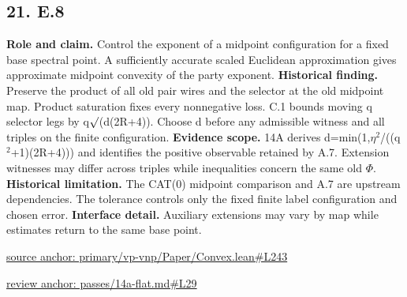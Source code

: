\documentclass[11pt,letterpaper]{article}
\theoremstyle{definition}\newtheorem{definition}[theorem]{Definition}\newtheorem{example}[theorem]{Example}
\theoremstyle{remark}\newtheorem{remark}[theorem]{Remark}
\begin{document}
\subsection*{21. E.8}
\textbf{Role and claim.} Control the exponent of a midpoint configuration for a fixed base spectral point. A sufficiently accurate scaled Euclidean approximation gives approximate midpoint convexity of the party exponent.
\textbf{Historical finding.} Preserve the product of all old pair wires and the selector at the old midpoint map. Product saturation fixes every nonnegative loss. C.1 bounds moving q selector legs by q\ensuremath{\sqrt{\vphantom{x}}}(d(2R+4)). Choose d before any admissible witness and all triples on the finite configuration.
\textbf{Evidence scope.} 14A derives d=min(1,\ensuremath{\eta}\ensuremath{{}^2}/((q\ensuremath{{}^2}+1)(2R+4))) and identifies the positive observable retained by A.7. Extension witnesses may differ across triples while inequalities concern the same old \ensuremath{\Phi}.
\textbf{Historical limitation.} The CAT(0) midpoint comparison and A.7 are upstream dependencies. The tolerance controls only the fixed finite label configuration and chosen error.
\textbf{Interface detail.} Auxiliary extensions may vary by map while estimates return to the same base point.
\par\href{https://github.com/nousentllc/VP-VNP-Review/blob/8a7976933b6b2b4ffda1ad3a0dfb5fc6b6f023e8/primary/vp-vnp/Paper/Convex.lean\#L243}{source anchor: primary/vp-vnp/Paper/Convex.lean\#L243}
\par\href{https://github.com/nousentllc/VP-VNP-Review/blob/8a7976933b6b2b4ffda1ad3a0dfb5fc6b6f023e8/passes/14a-flat.md\#L29}{review anchor: passes/14a-flat.md\#L29}
\goodbreak
{}
\hypertarget{claim.22}{}
\end{document}
